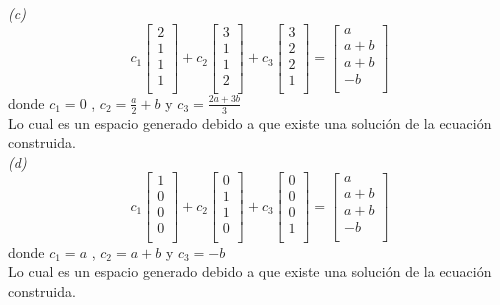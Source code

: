 \documentclass[12pt]{article}
\begin{document}
\emph{(c)}
\[c_1
\begin{bmatrix}
    2  \\
    1  \\
    1  \\
    1  \\
\end{bmatrix}
+c_2 \begin{bmatrix}
    3  \\
    1  \\
    1  \\
    2  \\
\end{bmatrix}
+c_3\begin{bmatrix}
    3  \\
    2  \\
    2  \\
    1  \\
\end{bmatrix}
=
\begin{bmatrix}
    a  \\
    a+b  \\
    a+b \\
    -b  \\
\end{bmatrix}
\]
donde $c_1=0$ , $c_2=\frac{a}{2}+b$ y $c_3=\frac{2a+3b}{3}$ \\
Lo cual es un espacio generado debido a que existe una solución de la ecuación construida.\\

\emph{(d)}
\[c_1
\begin{bmatrix}
    1  \\
    0  \\
    0  \\
    0  \\
\end{bmatrix}
+c_2 \begin{bmatrix}
    0  \\
    1  \\
    1  \\
    0  \\
\end{bmatrix}
+c_3\begin{bmatrix}
    0  \\
    0  \\
    0  \\
    1  \\
\end{bmatrix}
=
\begin{bmatrix}
    a  \\
    a+b  \\
    a+b \\
    -b  \\
\end{bmatrix}
\]
donde $c_1=a$ , $c_2=a+b$ y $c_3=-b $\\
Lo cual es un espacio generado debido a que existe una solución de la ecuación construida.\\
\end{document}
